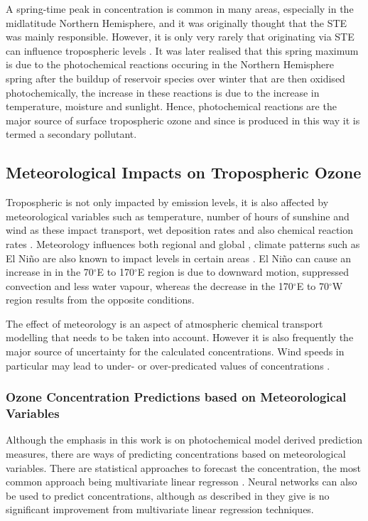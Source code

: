 A spring-time peak in  concentration is common in many areas, especially in the midlatitude Northern Hemisphere, and it 
was originally thought that the STE was mainly responsible. However, it is only very rarely that  originating via STE 
can influence tropospheric  levels \citep{Lelieveld:2000}. It was later realised that this spring maximum is due to the
photochemical reactions occuring in the Northern Hemisphere spring after the buildup of reservoir species over winter 
\citep{Penkett:1986} that are then oxidised photochemically, the increase in these reactions is due to the increase in 
temperature, moisture and sunlight. Hence, photochemical reactions are the major source of surface tropospheric ozone 
\citep{Lelieveld:2000} and since  is produced in this way it is termed a secondary pollutant.

\subsection{Meteorological Impacts on Tropospheric Ozone}
Tropospheric  is not only impacted by emission levels, it is also affected by meteorological variables such as 
temperature, number of hours of sunshine and wind as these impact transport, wet deposition rates and also chemical reaction 
rates \citep{Hess:2009}. Meteorology influences both regional and global  \citep{Hess:2009}, climate patterns such as El 
Ni\~{n}o are also known to impact  levels in certain areas \citep{Sudo:2001}. El Ni\~{n}o can cause an increase in 
 in the 70$^{\circ}$E to 170$^{\circ}$E region is due to downward motion, suppressed convection and less water vapour, 
whereas the  decrease in the 170$^{\circ}$E to 70$^{\circ}$W region results from the opposite conditions.

The effect of meteorology is an aspect of atmospheric chemical transport modelling that needs to be taken into account. However
it is also frequently the major source of uncertainty for the calculated  concentrations. Wind speeds in particular may 
lead to under- or over-predicated values of  concentrations \citep{Sillman:1999}. 

\subsubsection{Ozone Concentration Predictions based on Meteorological Variables}

Although the emphasis in this work is on photochemical model derived  prediction measures, there are ways of predicting 
 concentrations based on meteorological variables. There are statistical approaches to forecast the  
concentration, the most common approach being multivariate linear regresson \citep{Comrie:1997}.  Neural networks can also be 
used to predict  concentrations, although as described in \citep{Comrie:1997} they give is no significant improvement 
from multivariate linear regression techniques.

